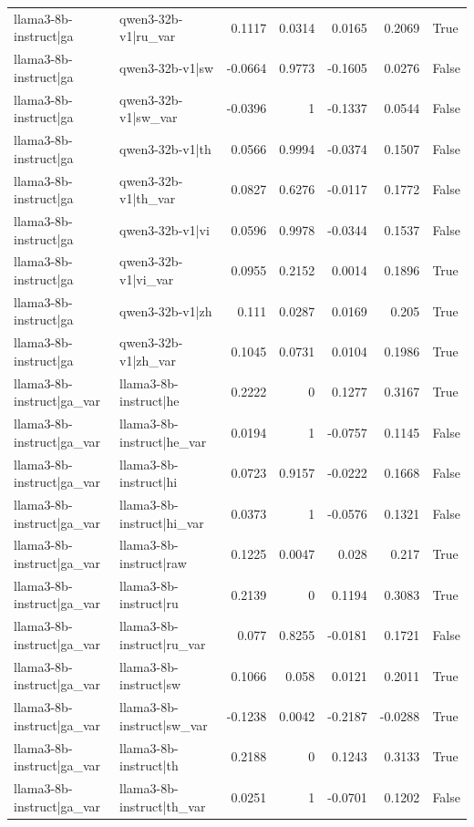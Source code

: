 \begin{table}
\begin{tabular}{l l r r r r l}
llama3-8b-instruct|ga & qwen3-32b-v1|ru_var & 0.1117 & 0.0314 & 0.0165 & 0.2069 & True \\
llama3-8b-instruct|ga & qwen3-32b-v1|sw & -0.0664 & 0.9773 & -0.1605 & 0.0276 & False \\
llama3-8b-instruct|ga & qwen3-32b-v1|sw_var & -0.0396 & 1 & -0.1337 & 0.0544 & False \\
llama3-8b-instruct|ga & qwen3-32b-v1|th & 0.0566 & 0.9994 & -0.0374 & 0.1507 & False \\
llama3-8b-instruct|ga & qwen3-32b-v1|th_var & 0.0827 & 0.6276 & -0.0117 & 0.1772 & False \\
llama3-8b-instruct|ga & qwen3-32b-v1|vi & 0.0596 & 0.9978 & -0.0344 & 0.1537 & False \\
llama3-8b-instruct|ga & qwen3-32b-v1|vi_var & 0.0955 & 0.2152 & 0.0014 & 0.1896 & True \\
llama3-8b-instruct|ga & qwen3-32b-v1|zh & 0.111 & 0.0287 & 0.0169 & 0.205 & True \\
llama3-8b-instruct|ga & qwen3-32b-v1|zh_var & 0.1045 & 0.0731 & 0.0104 & 0.1986 & True \\
llama3-8b-instruct|ga_var & llama3-8b-instruct|he & 0.2222 & 0 & 0.1277 & 0.3167 & True \\
llama3-8b-instruct|ga_var & llama3-8b-instruct|he_var & 0.0194 & 1 & -0.0757 & 0.1145 & False \\
llama3-8b-instruct|ga_var & llama3-8b-instruct|hi & 0.0723 & 0.9157 & -0.0222 & 0.1668 & False \\
llama3-8b-instruct|ga_var & llama3-8b-instruct|hi_var & 0.0373 & 1 & -0.0576 & 0.1321 & False \\
llama3-8b-instruct|ga_var & llama3-8b-instruct|raw & 0.1225 & 0.0047 & 0.028 & 0.217 & True \\
llama3-8b-instruct|ga_var & llama3-8b-instruct|ru & 0.2139 & 0 & 0.1194 & 0.3083 & True \\
llama3-8b-instruct|ga_var & llama3-8b-instruct|ru_var & 0.077 & 0.8255 & -0.0181 & 0.1721 & False \\
llama3-8b-instruct|ga_var & llama3-8b-instruct|sw & 0.1066 & 0.058 & 0.0121 & 0.2011 & True \\
llama3-8b-instruct|ga_var & llama3-8b-instruct|sw_var & -0.1238 & 0.0042 & -0.2187 & -0.0288 & True \\
llama3-8b-instruct|ga_var & llama3-8b-instruct|th & 0.2188 & 0 & 0.1243 & 0.3133 & True \\
llama3-8b-instruct|ga_var & llama3-8b-instruct|th_var & 0.0251 & 1 & -0.0701 & 0.1202 & False \\

\end{tabular}
\end{table}

